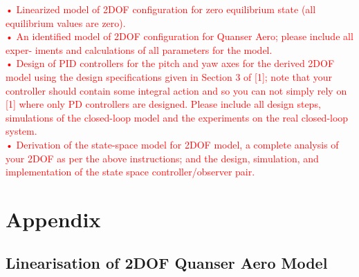 \documentclass[11pt]{article}
\begin{document}
\textcolor{red}{
• Linearized model of 2DOF configuration for zero equilibrium state (all equilibrium values are zero).\\
• An identified model of 2DOF configuration for Quanser Aero; please include all exper- iments and calculations of all parameters for the model.\\
• Design of PID controllers for the pitch and yaw axes for the derived 2DOF model using the design specifications given in Section 3 of [1]; note that your controller should contain some integral action and so you can not simply rely on [1] where only PD controllers are designed. Please include all design steps, simulations of the closed-loop model and the experiments on the real closed-loop system.\\
• Derivation of the state-space model for 2DOF model, a complete analysis of your 2DOF as per the above instructions; and the design, simulation, and implementation of the state space controller/observer pair.}

\newpage
\section{Appendix}
\subsection{Linearisation of 2DOF Quanser Aero Model}\label{app:linearise}
\end{document}
